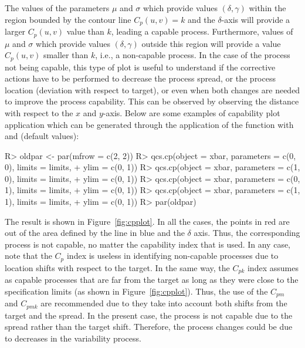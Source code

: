 The values of the parameters $\mu$ and $\sigma$ which provide values $\left( \delta,\gamma\right)$ within the region bounded by the contour line $C_p\left(u, v\right) = k$ and the $\delta$-axis will provide a larger $C_p\left(u, v\right)$ value than $k$, leading a capable process. 
Furthermore, values of $\mu$ and $\sigma$ which provide values $\left( \delta,\gamma\right)$ outside this region will provide a value $C_p\left(u, v\right)$ smaller than $k$, i.e., a non-capable process. 
In the case of the process not being capable, this type of plot is useful to understand if the corrective actions have to be performed to decrease the process spread, or the process location (deviation with respect to target), or even when both changes are needed to improve the process capability. 
This can be observed by observing the distance with respect to the $x$ and $y$-axis. 
Below are some examples of capability plot application which can be generated through the application of the  function with  and  (default values):
\begin{example}
R> oldpar <- par(mfrow = c(2, 2))
R> qcs.cp(object = xbar, parameters = c(0, 0), limits = limits, 
+         ylim = c(0, 1))
R> qcs.cp(object = xbar, parameters = c(1, 0), limits = limits,  
+         ylim = c(0, 1))
R> qcs.cp(object = xbar, parameters = c(0, 1), limits = limits,  
+         ylim = c(0, 1))
R> qcs.cp(object = xbar, parameters = c(1, 1), limits = limits,  
+         ylim = c(0, 1))
R> par(oldpar)
\end{example}
The result is shown in Figure~\ref{fig:cpplot}. In all the cases, the points in red are out of the area defined by the line in blue and the $\delta$ axis. 
Thus, the corresponding process is not capable, no matter the capability index that is used.
In any case, note that the $C_{p}$ index is useless in identifying non-capable processes due to location shifts 
with respect to the target. 
In the same way, the $C_{pk}$ index assumes as capable processes that are far from the target as long as they were close to the specification limits (as shown in Figure~\ref{fig:cpplot}). 
Thus, the use of the $C_{pm}$ and $C_{pmk}$ are recommended due to they take into account both shifts from the target and the spread. 
In the present case, the process is not capable due to the spread rather than the target shift.
Therefore, the process changes could be due to decreases in the variability process.
